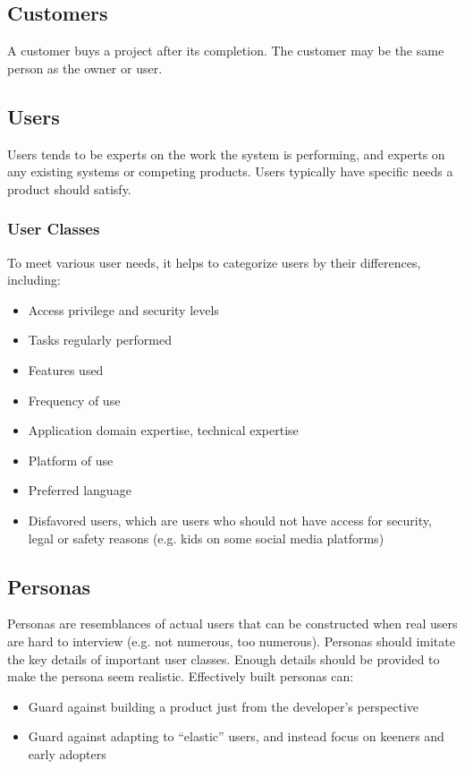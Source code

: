 \documentclass[12pt,titlepage]{article}
\begin{document}
    \subsection{Customers}
      A customer buys a project after its completion. The customer may be the same person as the owner or user.

    \subsection{Users}
      Users tends to be experts on the work the system is performing, and experts on any existing systems or competing products. Users typically
      have specific needs a product should satisfy.

      \subsubsection{User Classes}
        To meet various user needs, it helps to categorize users by their differences, including:
        \begin{itemize}
          \item Access privilege and security levels
          \item Tasks regularly performed
          \item Features used
          \item Frequency of use
          \item Application domain expertise, technical expertise
          \item Platform of use
          \item Preferred language
          \item Disfavored users, which are users who should not have access for security, legal or safety reasons (e.g. kids on some social media platforms)
        \end{itemize}

    \subsection{Personas}
      Personas are resemblances of actual users that can be constructed when real users are hard to interview (e.g. not numerous, too numerous). Personas
      should imitate the key details of important user classes. Enough details should be provided to make the persona seem realistic. Effectively built
      personas can:
      \begin{itemize}
        \item Guard against building a product just from the developer's perspective
        \item Guard against adapting to ``elastic'' users, and instead focus on keeners and early adopters
      \end{itemize}
\end{document}
